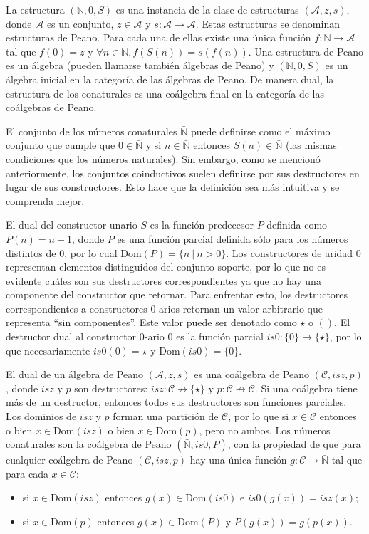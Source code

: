 La estructura $(\mathbb{N},0,S)$ es una instancia de la clase de estructuras $(\mathcal{A},z,s)$, donde $\mathcal{A}$ es un conjunto, $z \in \mathcal{A}$ y $s: \mathcal{A} \rightarrow \mathcal{A}$. Estas estructuras se denominan estructuras de Peano. Para cada una de ellas existe una única función $f : \mathbb{N} \rightarrow \mathcal{A}$ tal que $f(0) = z$ y $\forall n \in \mathbb{N}, f(S(n)) = s(f(n))$. Una estructura de Peano es un álgebra (pueden llamarse también álgebras de Peano) y $(\mathbb{N},0,S)$ es un álgebra inicial en la categoría de las álgebras de Peano.
De manera dual, la estructura de los conaturales es una coálgebra final en la categoría de las coálgebras de Peano. 

El conjunto de los números conaturales $\bar{\mathbb{N}}$ puede definirse como el máximo conjunto que cumple que $0 \in \bar{\mathbb{N}}$ y si $n \in \bar{\mathbb{N}}$ entonces $S(n) \in \bar{\mathbb{N}}$ (las mismas condiciones que los números naturales). Sin embargo, como se mencionó anteriormente, los conjuntos coinductivos suelen definirse por sus destructores en lugar de sus constructores. Esto hace que la definición sea más intuitiva y se comprenda mejor. 

El dual del constructor unario $S$ es la función predecesor $P$ definida como $P(n) = n-1$, donde $P$ es una función parcial definida sólo para los números distintos de $0$, por lo cual $\mathrm{Dom}(P) = \{n \ |\  n > 0\}$. Los constructores de aridad $0$ representan elementos distinguidos del conjunto soporte, por lo que no es evidente cuáles son sus destructores correspondientes ya que no hay una componente del constructor que retornar. Para enfrentar esto, los destructores correspondientes a constructores 0-arios retornan un valor arbitrario que representa ``sin componentes''. Este valor puede ser denotado como $\star$ o $()$. El destructor dual al constructor 0-ario $0$ es la función parcial $is0 : \{0\} \rightarrow \{\star\}$, por lo que necesariamente $is0(0) = \star$ y $\mathrm{Dom}(is0) = \{0\}$. 

El dual de un álgebra de Peano $(\mathcal{A},z,s)$ es una coálgebra de Peano $(\mathcal{C},isz,p)$, donde $isz$ y $p$ son destructores: $isz: \mathcal{C} \nrightarrow  \{\star\}$ y $p : \mathcal{C} \nrightarrow \mathcal{C}$. Si una coálgebra tiene más de un destructor, entonces todos sus destructores son funciones parciales. Los dominios de $isz$ y $p$ forman una partición de $\mathcal{C}$, por lo que si $x \in \mathcal{C}$ entonces o bien $x \in \mathrm{Dom}(isz)$ o bien $x \in \mathrm{Dom}(p)$, pero no ambos. Los números conaturales son la coálgebra de Peano $(\bar{\mathbb{N}},is0,P)$, con la propiedad de que para cualquier coálgebra de Peano $(\mathcal{C},isz,p)$ hay una única función $g : \mathcal{C} \rightarrow \bar{\mathbb{N}}$ tal que para cada $x \in \mathcal{C}$:
\begin{itemize}
\item si $x \in \mathrm{Dom}(isz)$ entonces $g(x) \in \mathrm{Dom}(is0)$ e $is0(g(x)) = isz(x)$;
\item si $x \in \mathrm{Dom}(p)$ entonces $g(x) \in \mathrm{Dom}(P)$ y $P(g(x)) = g(p(x))$.
\end{itemize}

